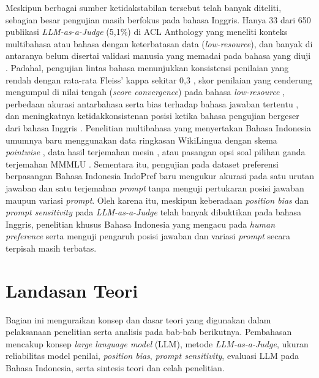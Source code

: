 Meskipun berbagai sumber ketidakstabilan tersebut telah banyak diteliti, sebagian besar pengujian masih berfokus pada bahasa Inggris. Hanya 33 dari 650 publikasi \textit{LLM-as-a-Judge} (5,1\%) di ACL Anthology yang meneliti konteks multibahasa atau bahasa dengan keterbatasan data (\textit{low-resource}), dan banyak di antaranya belum disertai validasi manusia yang memadai pada bahasa yang diuji \cite{dogruozChallengesRecommendationsLLMasaJudge2026}. Padahal, pengujian lintas bahasa menunjukkan konsistensi penilaian yang rendah dengan rata-rata Fleiss' kappa sekitar 0,3 \cite{fuHowReliableMultilingual2025}, skor penilaian yang cenderung mengumpul di nilai tengah (\textit{score convergence}) pada bahasa \textit{low-resource} \cite{sonMMEvalMultilingualMetaEvaluation2025}, perbedaan akurasi antarbahasa serta bias terhadap bahasa jawaban tertentu \cite{zhouFairnessFluencyInvestigation2026}, dan meningkatnya ketidakkonsistenan posisi ketika bahasa pengujian bergeser dari bahasa Inggris \cite{yinDoesJudgePrefer2026}. Penelitian multibahasa yang menyertakan Bahasa Indonesia umumnya baru menggunakan data ringkasan WikiLingua dengan skema \textit{pointwise} \cite{fuHowReliableMultilingual2025}, data hasil terjemahan mesin \cite{pombalMPrometheusSuiteOpen2025}, atau pasangan opsi soal pilihan ganda terjemahan MMMLU \cite{zhouFairnessFluencyInvestigation2026}. Sementara itu, pengujian pada dataset preferensi berpasangan Bahasa Indonesia IndoPref \cite{wiyonoIndoPrefMultiDomainPairwise2025} baru mengukur akurasi pada satu urutan jawaban dan satu terjemahan \textit{prompt} tanpa menguji pertukaran posisi jawaban maupun variasi \textit{prompt}. Oleh karena itu, meskipun keberadaan \textit{position bias} dan \textit{prompt sensitivity} pada \textit{LLM-as-a-Judge} telah banyak dibuktikan pada bahasa Inggris, penelitian khusus Bahasa Indonesia yang mengacu pada \textit{human preference} serta menguji pengaruh posisi jawaban dan variasi \textit{prompt} secara terpisah masih terbatas.

\section{Landasan Teori}

Bagian ini menguraikan konsep dan dasar teori yang digunakan dalam pelaksanaan penelitian serta analisis pada bab-bab berikutnya. Pembahasan mencakup konsep \textit{large language model} (LLM), metode \textit{LLM-as-a-Judge}, ukuran reliabilitas model penilai, \textit{position bias}, \textit{prompt sensitivity}, evaluasi LLM pada Bahasa Indonesia, serta sintesis teori dan celah penelitian.

